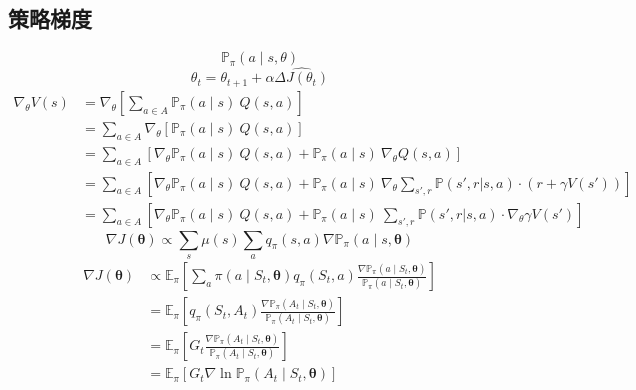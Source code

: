 \documentclass{article}
\begin{document}
    \subsection{策略梯度}
        $$\mathbb{P}_\pi (a \mid s, \theta)$$
        $$ \theta_t = \theta_{t+1} + \alpha  \widehat{\Delta J(\theta_t)}$$
        \begin{align*}
            \nabla_\theta V(s)
            &= \nabla_\theta \left[\sum_{a \in A} \mathbb{P}_\pi (a \mid s)\ Q(s,a) \right] \tag{期望公式}\\
            &= \sum_{a \in A} \nabla_\theta \left[ \mathbb{P}_\pi (a \mid s)\ Q(s,a) \right] \tag{分配律}\\
            &= \sum_{a \in A} \left[ \nabla_\theta \mathbb{P}_\pi (a \mid s)\ Q(s,a) + \mathbb{P}_\pi (a \mid s)\ \nabla_\theta Q(s,a) \right] \tag{微分乘法法则}\\
            &= \sum_{a \in A} \left[ \nabla_\theta \mathbb{P}_\pi (a \mid s)\ Q(s,a) + \mathbb{P}_\pi (a \mid s)\ \nabla_\theta \sum_{s', r} \mathbb{P}(s', r | s, a)\cdot \left(r + \gamma V(s') \right) \right] \tag{代入}\\
            &= \sum_{a \in A} \left[ \nabla_\theta \mathbb{P}_\pi (a \mid s)\ Q(s,a) + \mathbb{P}_\pi (a \mid s)\ \sum_{s', r} \mathbb{P}(s', r | s, a)\cdot \nabla_\theta \gamma V(s') \right] \tag{分配律}
        \end{align*}
        $$\nabla J(\boldsymbol{\theta}) \propto \sum_{s} \mu(s) \sum_{a} q_{\pi}(s, a) \nabla \mathbb{P}_\pi(a \mid s, \boldsymbol{\theta})$$
        \begin{align*}
            \nabla J(\boldsymbol{\theta}) 
            & \propto \mathbb{E}_{\pi}\left[\sum_{a} \pi\left(a \mid S_{t}, \boldsymbol{\theta}\right) q_{\pi}\left(S_{t}, a\right) \frac{\nabla \mathbb{P}_\pi\left(a \mid S_{t}, \boldsymbol{\theta}\right)}{\mathbb{P}_\pi\left(a \mid S_{t}, \boldsymbol{\theta}\right)}\right] \\
            &= \mathbb{E}_{\pi}\left[q_{\pi}\left(S_{t}, A_{t}\right) \frac{\nabla \mathbb{P}_\pi\left(A_{t} \mid S_{t}, \boldsymbol{\theta}\right)}{\mathbb{P}_\pi\left(A_{t} \mid S_{t}, \boldsymbol{\theta}\right)}\right] \\
            &= \mathbb{E}_{\pi}\left[G_{t} \frac{\nabla \mathbb{P}_\pi\left(A_{t} \mid S_{t}, \boldsymbol{\theta}\right)}{\mathbb{P}_\pi\left(A_{t} \mid S_{t}, \boldsymbol{\theta}\right)}\right]\\
            &= \mathbb{E}_{\pi}\left[G_{t} \nabla \ln \mathbb{P}_\pi \left(A_{t} \mid S_{t}, \boldsymbol{\theta}\right)\right]
        \end{align*}
\end{document}
